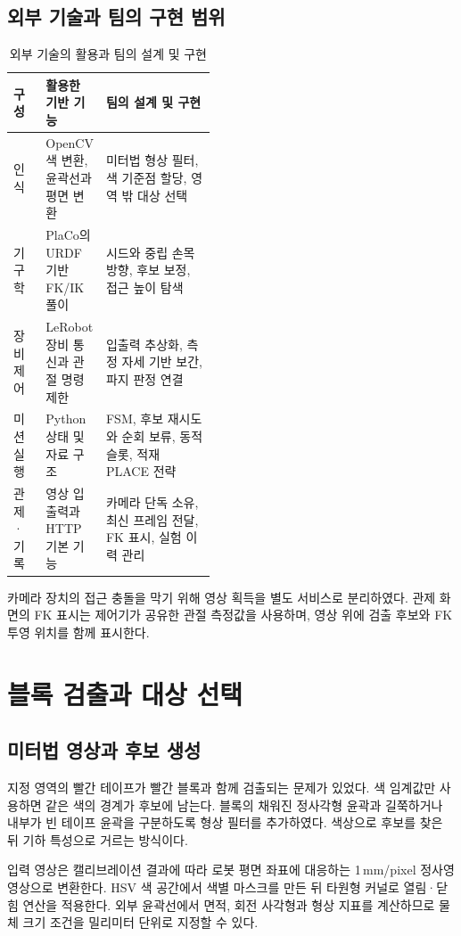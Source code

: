 \subsection{외부 기술과 팀의 구현 범위}
\begin{table}[htbp]
\centering
\caption{외부 기술의 활용과 팀의 설계 및 구현}
\begin{tabularx}{\linewidth}{@{}L{0.16\linewidth}L{0.29\linewidth}Y@{}}
\toprule
구성 & 활용한 기반 기능 & 팀의 설계 및 구현 \\
\midrule
인식 & OpenCV 색 변환, 윤곽선과 평면 변환 & 미터법 형상 필터, 색 기준점 할당, 영역 밖 대상 선택 \\
기구학 & PlaCo의 URDF 기반 FK/IK 풀이 & 시드와 중립 손목 방향, 후보 보정, 접근 높이 탐색 \\
장비 제어 & LeRobot 장비 통신과 관절 명령 제한 & 입출력 추상화, 측정 자세 기반 보간, 파지 판정 연결 \\
미션 실행 & Python 상태 및 자료 구조 & FSM, 후보 재시도와 순회 보류, 동적 슬롯, 적재 PLACE 전략 \\
관제·기록 & 영상 입출력과 HTTP 기본 기능 & 카메라 단독 소유, 최신 프레임 전달, FK 표시, 실험 이력 관리 \\
\bottomrule
\end{tabularx}
\end{table}

카메라 장치의 접근 충돌을 막기 위해 영상 획득을 별도 서비스로 분리하였다. 관제 화면의 FK 표시는 제어기가 공유한 관절 측정값을 사용하며, 영상 위에 검출 후보와 FK 투영 위치를 함께 표시한다.

\section{블록 검출과 대상 선택}
\subsection{미터법 영상과 후보 생성}
지정 영역의 빨간 테이프가 빨간 블록과 함께 검출되는 문제가 있었다. 색 임계값만 사용하면 같은 색의 경계가 후보에 남는다. 블록의 채워진 정사각형 윤곽과 길쭉하거나 내부가 빈 테이프 윤곽을 구분하도록 형상 필터를 추가하였다. 색상으로 후보를 찾은 뒤 기하 특성으로 거르는 방식이다.

입력 영상은 캘리브레이션 결과에 따라 로봇 평면 좌표에 대응하는 1\,mm/pixel 정사영 영상으로 변환한다. HSV 색 공간에서 색별 마스크를 만든 뒤 타원형 커널로 열림·닫힘 연산을 적용한다. 외부 윤곽선에서 면적, 회전 사각형과 형상 지표를 계산하므로 물체 크기 조건을 밀리미터 단위로 지정할 수 있다.

